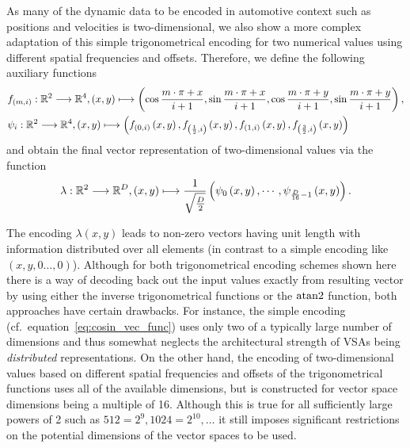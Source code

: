 As many of the dynamic data to be encoded in automotive context such as positions and velocities is two-dimensional, we also show a more complex adaptation of this simple trigonometrical encoding for two numerical values using different spatial frequencies and offsets.
Therefore, we define the following auxiliary functions
\begin{align}
    &f_{\left(m,i\right)}: \mathbb{R}^2 \longrightarrow \mathbb{R}^4, \left(x,y\right) \longmapsto \left(\cos\frac{m\cdot \pi + x}{i + 1}, \sin\frac{m\cdot \pi + x}{i + 1}, \cos\frac{m\cdot \pi + y}{i + 1}, \sin\frac{m\cdot \pi + y}{i + 1}\right), \label{eq:cos_aux_1} \\
    &\psi_i: \mathbb{R}^2 \longrightarrow \mathbb{R}^4, \left(x,y\right) \longmapsto \left(f_{\left(0,i\right)}\left(x,y\right), f_{\left(\frac{1}{2},i\right)}\left(x,y\right), f_{\left(1,i\right)}\left(x,y\right), f_{\left(\frac{3}{2},i\right)}\left(x,y\right)\right) \label{eq:cos_aux_2}
\end{align}
and obtain the final vector representation of two-dimensional values via the function 
\begin{equation}
\label{eq:cosin_2d_enc}
\lambda: \mathbb{R}^2 \longrightarrow \mathbb{R}^D, \left(x,y\right) \longmapsto \frac{1}{\sqrt{\frac{D}{2}}}\left(\psi_0\left(x,y\right), \cdots, \psi_{\frac{D}{16}-1}\left(x,y\right)\right).
\end{equation}

The encoding $\lambda\left(x, y\right)$ leads to non-zero vectors having unit length with information distributed over all elements (in contrast to a simple encoding like $\left(x, y, 0 \ldots, 0\right)$).
Although for both trigonometrical encoding schemes shown here there is a way of decoding back out the input values exactly from resulting vector by using either the inverse trigonometrical functions or the $\operatorname{atan2}$ function, both approaches have certain drawbacks.
For instance, the simple encoding (cf.\ equation~\eqref{eq:cosin_vec_func}) uses only two of a typically large number of dimensions and thus somewhat neglects the architectural strength of \acp{VSA} being \emph{distributed} representations.
On the other hand, the encoding of two-dimensional values based on different spatial frequencies and offsets of the trigonometrical functions uses all of the available dimensions, but is constructed for vector space dimensions being a multiple of \num{16}.
Although this is true for all sufficiently large powers of \num{2} such as $512=2^{9}, 1024=2^{10}, \ldots$ it still imposes significant restrictions on the potential dimensions of the vector spaces to be used.

